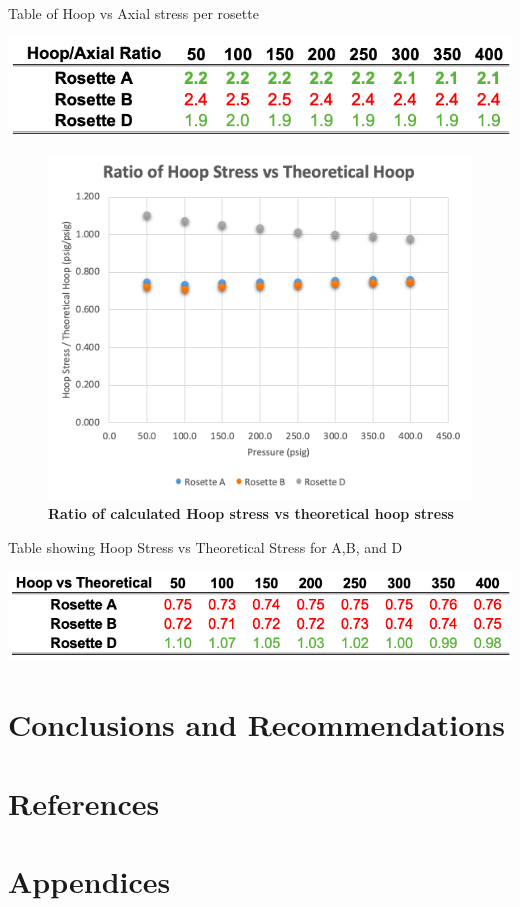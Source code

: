 \documentclass{article}
\begin{document}
\begin{table}[H]
  \caption{Table of Hoop vs Axial stress per rosette}
  \includegraphics[width=\linewidth]{table_hoop_axial}
  \centering
\end{table}

\begin{figure} [H]
	\centering
	\includegraphics [width=1.0\textwidth]{plot_hoop_vs_theoretical_ratio}
	\caption{ \textbf{ Ratio of calculated Hoop stress vs theoretical hoop stress }}
\end{figure} 

\begin{table}[H]
  \caption{Table showing Hoop Stress vs Theoretical Stress for A,B, and D }
  \includegraphics[width=\linewidth]{table_hoop_theoretical}
  \centering
\end{table}

\section {Conclusions and Recommendations}



\section {References}


\section {Appendices}
\end{document}
